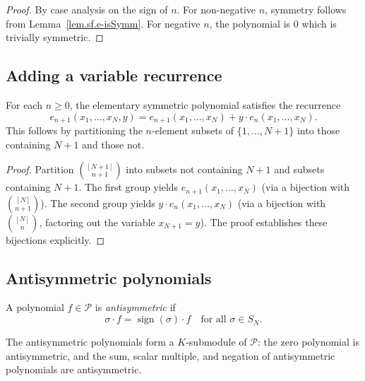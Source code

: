 \begin{proof}
By case analysis on the sign of $n$.
For non-negative $n$, symmetry follows from Lemma~\ref{lem.sf.e-isSymm}.
For negative $n$, the polynomial is $0$ which is trivially symmetric.
\end{proof}

\subsection{Adding a variable recurrence}

\begin{lemma}
\label{lem.sf.esymm-add-var}
\leanhelper
\leanok
For each $n \geq 0$, the elementary symmetric polynomial satisfies the recurrence
\[
e_{n+1}(x_1, \ldots, x_N, y) = e_{n+1}(x_1, \ldots, x_N) + y \cdot e_n(x_1, \ldots, x_N).
\]
This follows by partitioning the $n$-element subsets of $\{1, \ldots, N+1\}$ into those
containing $N+1$ and those not.
\end{lemma}

\begin{proof}
Partition $\binom{[N+1]}{n+1}$ into subsets not containing $N+1$ and subsets containing $N+1$.
The first group yields $e_{n+1}(x_1, \ldots, x_N)$ (via a bijection with $\binom{[N]}{n+1}$).
The second group yields $y \cdot e_n(x_1, \ldots, x_N)$ (via a bijection with $\binom{[N]}{n}$,
factoring out the variable $x_{N+1} = y$). The proof establishes
these bijections explicitly.
\end{proof}

\subsection{Antisymmetric polynomials}

\begin{definition}
\label{def.sf.antisymm}
\leanhelper
\leanok
A polynomial $f \in \mathcal{P}$ is \emph{antisymmetric} if
\[
\sigma \cdot f = \operatorname{sign}(\sigma) \cdot f \quad \text{for all } \sigma \in S_N.
\]
\end{definition}

\begin{lemma}
\label{lem.sf.antisymm-submodule}
\leanhelper
\leanok
The antisymmetric polynomials form a $K$-submodule of $\mathcal{P}$: the zero polynomial
is antisymmetric, and the sum, scalar multiple, and negation of antisymmetric polynomials
are antisymmetric.
\end{lemma}

